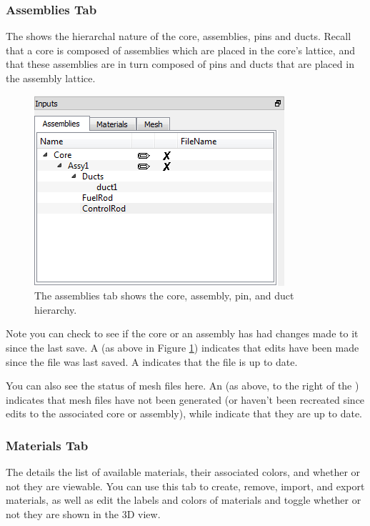 \subsubsection{Assemblies Tab}
The  shows the hierarchal nature of the core, assemblies, pins and ducts.  Recall that a core is composed of assemblies which are placed in the core's lattice, and that these assemblies are in turn composed of pins and ducts that are placed in the assembly lattice.

\begin{figure}[H]
	\begin{center}
		\includegraphics[width=0.5\linewidth]{Images/assemblies-tab.png}
		\caption{The assemblies tab shows the core, assembly, pin, and duct hierarchy.}
		\label{fig:mainwindow2}
	\end{center}
\end{figure}

Note you can check to see if the core or an assembly has had changes made to it since the last save.  A  (as above in Figure \ref{fig:mainwindow2}) indicates that edits have been made since the file was last saved.  A  indicates that the file is up to date.

You can also see the status of mesh files here.  An  (as above, to the right of the ) indicates that mesh files have not been generated (or haven't been recreated since edits to the associated core or assembly), while  indicate that they are up to date.

\subsubsection{Materials Tab}
The  details the list of available materials, their associated colors, and whether or not they are viewable.  You can use this tab to create, remove, import, and export materials, as well as edit the labels and colors of materials and toggle whether or not they are shown in the 3D view.


